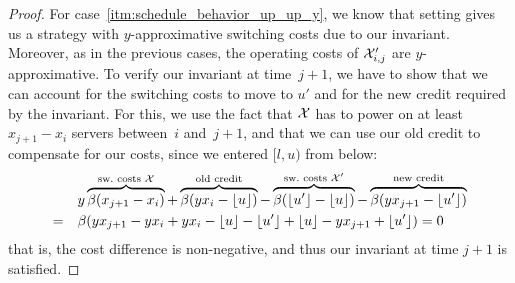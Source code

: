 \begin{proof}
For case~\ref{itm:schedule_behavior_up_up_y}, we know that setting  gives us a strategy with $y$-approximative switching costs due to our invariant. Moreover, as in the previous cases, the operating costs of $\mathcal{X}_{i,j}'$ are $y$-approximative. 
To verify our invariant at time~$j+1$, we have to show that we can account for the switching costs to move to $u'$ and for the new credit required by the invariant. For this, we use the fact that $\mathcal{X}$ has to power on at least $x_{j+1}-x_i$ servers between~$i$ and~$j+1$, and that we can use our old credit to compensate for our costs, since we entered $[l,u)$ from below:
\begin{align*}
	&y\overbrace{\beta(x_{j+1}-x_i)}^{\text{sw.\ costs }\mathcal{X}}+\overbrace{\beta(yx_i-\lfloor u\rfloor)}^{\text{old credit}}-\overbrace{\beta(\lfloor u'\rfloor-\lfloor u\rfloor)}^{\text{sw.\ costs }\mathcal{X}'}-\overbrace{\beta(yx_{j+1}-\lfloor u'\rfloor)}^{\text{new credit}}\\
	=\quad&\beta(yx_{j+1}-yx_i+yx_i-\lfloor u\rfloor-\lfloor u'\rfloor+\lfloor u\rfloor-yx_{j+1}+\lfloor u'\rfloor)=0
\end{align*}
that is, the cost difference is non-negative, and thus our invariant at time $j+1$ is satisfied.
	

\end{proof}
